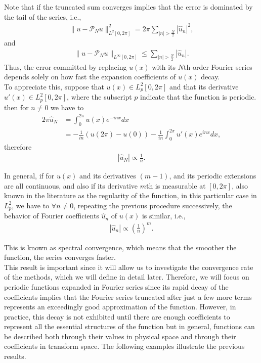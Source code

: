 	Note that if the truncated sum converges implies that the error is dominated by the tail of the series, i.e.,
	\begin{align*}
		\|u -  \mathcal{P}_N u \|^2_{L^2 [0, 2\pi]} = 2 \pi	\displaystyle \sum_{ |n| > \frac{N}{2} } |\hat{u}_n|^2,
	\end{align*}	
	and	
	\begin{align*}
		\|u -  \mathcal{P}_N u \|_{L^{\infty} [0, 2\pi]} \leq 
		\displaystyle \sum_{|n| > \frac{N}{2}} |\hat{u}_n|. 
	\end{align*}
	Thus, the error committed by replacing $u(x)$ with its $N$th-order Fourier series depends solely on how fast the expansion coefficients of $u(x)$ decay. \\
	
	To appreciate this, suppose that $u(x) \in L^2_p [0, 2 \pi]$ and that its derivative $u'(x) \in L^2_p [0, 2\pi]$, where the subscript $p$ indicate that the function is periodic. then for $n \neq 0$ we have to
	\begin{align*}
		2\pi \hat{u}_N &= \displaystyle \int_{0}^{2\pi} u(x) e^{-inx} dx \\
		&= - \frac{1}{in} (u(2\pi) - u(0)) - \frac{1}{in} \displaystyle \int_{0}^{2\pi} u'(x) e^{inx} dx, 
	\end{align*}
	therefore
	\begin{align*}
		|\hat{u}_N| \propto \frac{1}{n}.
	\end{align*}
	
	In general, if for $u(x)$ and its derivatives $(m - 1)$, and its periodic extensions are all continuous, and also if its derivative $m$th is measurable at $[0, 2 \pi]$, also known in the literature as the regularity of the function, in this particular case in $L^2_p$, we have to $\forall n \neq 0$, repeating the previous procedure successively, the behavior of Fourier coefficients $\hat{u}_n$ of $u(x)$ is similar, i.e.,
	\begin{align*}
		|\hat{u}_n| \propto \left(\frac{1}{n}\right)^m.
	\end{align*}
	
	 This is known as spectral convergence, which means that the smoother the function, the series converges faster.\\
	 
	 This result is important since it will allow us to investigate the convergence rate of the methods, which we will define in detail later. Therefore, we will focus on periodic functions expanded in Fourier series since its rapid decay of the coefficients implies that the Fourier series truncated after just a few more terms represents an exceedingly good approximation of the function. However, in practice, this decay is not exhibited until there are enough coefficients to represent all the essential structures of the function but in general, functions can be described both through their values in physical space and through their coefficients in transform space. The following examples illustrate the previous results. \\
	 
